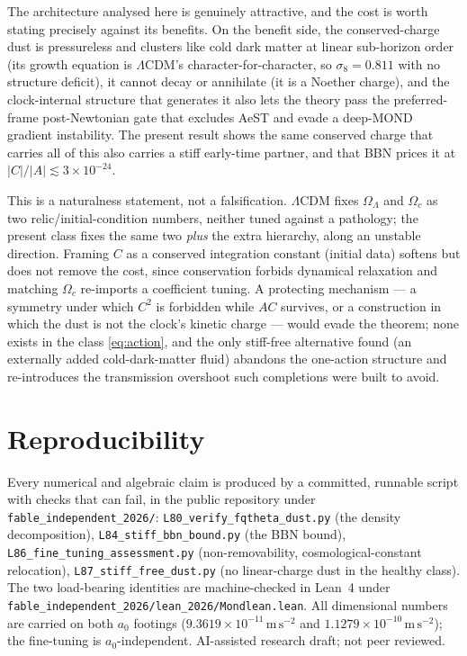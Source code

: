 \documentclass[11pt,letterpaper]{article}
\newcommand{\ms}{\,\mathrm{m\,s^{-2}}}
\begin{document}
The architecture analysed here is genuinely attractive, and the cost is worth stating precisely against its
benefits. On the benefit side, the conserved-charge dust is pressureless and clusters like cold dark matter
at linear sub-horizon order (its growth equation is $\Lambda$CDM's character-for-character, so
$\sigma_8=0.811$ with no structure deficit), it cannot decay or annihilate (it is a Noether charge), and the
clock-internal structure that generates it also lets the theory pass the preferred-frame post-Newtonian gate
that excludes AeST and evade a deep-MOND gradient instability. The present result shows the same conserved
charge that carries all of this also carries a stiff early-time partner, and that BBN prices it at
$|C|/|A|\lesssim3\times10^{-24}$.

This is a naturalness statement, not a falsification. $\Lambda$CDM fixes $\Omega_\Lambda$ and $\Omega_c$ as
two relic/initial-condition numbers, neither tuned against a pathology; the present class fixes the same two
\emph{plus} the extra hierarchy, along an unstable direction. Framing $C$ as a conserved integration
constant (initial data) softens but does not remove the cost, since conservation forbids dynamical
relaxation and matching $\Omega_c$ re-imports a coefficient tuning. A protecting mechanism --- a symmetry
under which $C^2$ is forbidden while $AC$ survives, or a construction in which the dust is not the clock's
kinetic charge --- would evade the theorem; none exists in the class \eqref{eq:action}, and the only
stiff-free alternative found (an externally added cold-dark-matter fluid) abandons the one-action structure
and re-introduces the transmission overshoot such completions were built to avoid.

\section{Reproducibility}

Every numerical and algebraic claim is produced by a committed, runnable script with checks that can fail, in
the public repository under \texttt{fable\_independent\_2026/}: \texttt{L80\_verify\_fqtheta\_dust.py} (the
density decomposition), \texttt{L84\_stiff\_bbn\_bound.py} (the BBN bound), \texttt{L86\_fine\_tuning\_assessment.py}
(non-removability, cosmological-constant relocation), \texttt{L87\_stiff\_free\_dust.py} (no linear-charge
dust in the healthy class). The two load-bearing identities are machine-checked in Lean~4 under
\texttt{fable\_independent\_2026/lean\_2026/Mondlean.lean}. All dimensional numbers are carried on both
$a_0$ footings ($9.3619\times10^{-11}\ms$ and $1.1279\times10^{-10}\ms$); the fine-tuning is
$a_0$-independent. AI-assisted research draft; not peer reviewed.
\end{document}
